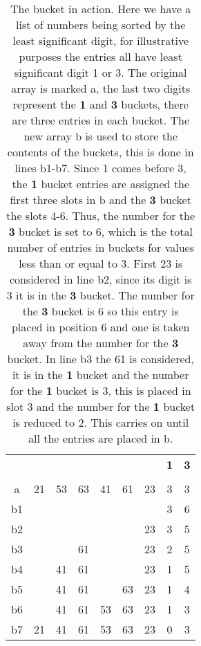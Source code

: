 \documentclass[11pt,a4paper]{scrartcl}
\begin{document}
\begin{table}
\begin{tabular}{c|cccccc|c|c}
 &  &  &  &  &  &  &{\bf 1}&{\bf 3}\\
 &  &  &  &  &  &  &&\\
a&21&53&63&41&61&23&3&3\\
\hline
b1&  &  &  &  &  & &3&6\\
b2&  &  &  &  &  &23&3&5\\
b3&  &  &61&  &  &23&2&5\\
b4&  &41&61&  &  &23&1&5\\
b5&  &41&61&  &63&23&1&4\\
b6&  &41&61&53&63&23&1&3\\
b7&21&41&61&53&63&23&0&3
\end{tabular}
\caption{The bucket in action. Here we have a list of numbers being
  sorted by the least significant digit, for illustrative purposes the
  entries all have least significant digit 1 or 3. The original array
  is marked a, the last two digits represent the {\bf 1} and {\bf 3} buckets,
  there are three entries in each bucket. The new array b is used to
  store the contents of the buckets, this is done in lines
  b1-b7. Since 1 comes before 3, the {\bf 1} bucket entries are assigned the
  first three slots in b and the {\bf 3} bucket the slots 4-6. Thus, the
  number for the {\bf 3} bucket is set to 6, which is the total number of
  entries in buckets for values less than or equal to 3. First 23 is
  considered in line b2, since its digit is 3 it is in the {\bf 3}
  bucket. The number for the {\bf 3} bucket is 6 so this entry is placed in
  position 6 and one is taken away from the number for the {\bf 3}
  bucket. In line b3 the 61 is considered, it is in the {\bf 1} bucket and
  the number for the {\bf 1} bucket is 3, this is placed in slot 3 and the
  number for the {\bf 1} bucket is reduced to 2. This carries on until all
  the entries are placed in b. \label{table_buckets}}
\end{table}
\end{document}
